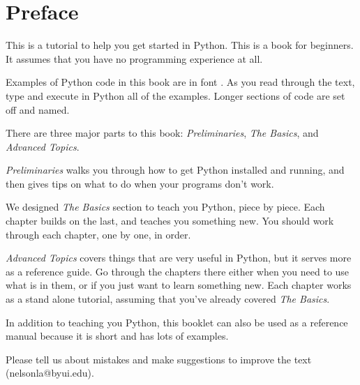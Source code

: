 \chapter*{Preface}

This is a tutorial to help you get started in Python.  This is a book for beginners. It assumes that you have no programming experience at all.

Examples of Python code in this book are in font . As you read through the text, type and execute in Python all
of the examples. Longer sections of code
are set off and named.

There are three major parts to this book: {\em Preliminaries}, {\em The Basics}, and {\em Advanced Topics}.

{\em Preliminaries} walks you through how to get Python installed and running, and then gives tips on what to do when your programs don't work.

We designed {\em The Basics} section to teach you Python, piece by piece.  Each chapter builds on the last, and teaches you something new. You should work through each chapter, one by one, in order.

{\em Advanced Topics} covers things that are very useful in Python, but it serves more as a reference guide.  Go through the chapters there either when you need to use what is in them, or if you just want to learn something new.  Each chapter works as a stand alone tutorial, assuming that you've already covered {\em The Basics}.

In addition to teaching you Python, this booklet can also be used as a reference manual because it is
short and has lots of examples.

 Please tell us about mistakes and make suggestions to improve the text
(nelsonla@byui.edu).

